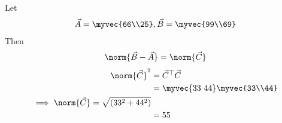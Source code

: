 Let
\begin{align}
    \vec{A} = \myvec{66\\25}, \vec{B} = \myvec{99\\69}
\end{align}
Then
\begin{align}
\norm{\vec{B}-\vec{A}}=\norm{\vec {C}}
\end{align}
\begin{align}
 \norm{\vec{C}}^2 &= \vec{C}^\top \vec{C} \\
&=  \myvec{33 \ 44} \myvec{33\\44}\\
\implies \norm{\vec{C}}=\sqrt{(33^2 + 44^2)}\\
&=55
\end{align}
